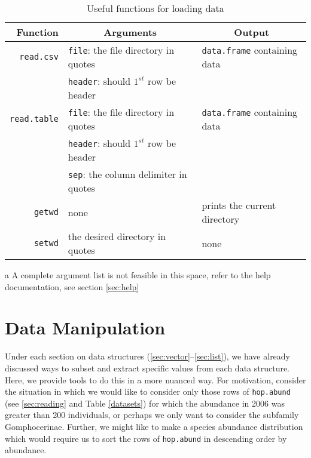 \documentclass[12pt]{article}
\begin{document}
\begin{table}[!htb]
	\begin{threeparttable}
	\caption{Useful functions for loading data}

	\begin{tabular}{r l l}
		\hline
		Function 	&	\multicolumn{1}{c}{Arguments\tnote{a}}		&	\multicolumn{1}{c}{Output}		\\
		\hline
		\verb+read.csv+	&	\verb+file+: the file directory in quotes			&	\verb+data.frame+ containing data	\\
						&	\verb+header+: should $1^{st}$ row be header		&								\\	
		\verb+read.table+	&	\verb+file+: the file directory in quotes			&	\verb+data.frame+ containing data	\\
						&	\verb+header+: should $1^{st}$ row be header		&								\\
						&	\verb+sep+: the column delimiter in quotes 		&								\\
		\verb+getwd+		&	none										&	prints the current directory		\\
		\verb+setwd+		&	the desired directory in quotes					&	none 						\\
		\hline
	\end{tabular}
	\begin{tablenotes}
		\item[a] A complete argument list is not feasible in this space, refer to the help documentation, see section \ref{sec:help}
	\end{tablenotes}
	\end{threeparttable}
\end{table}

\section{Data Manipulation}
Under each section on data structures (\ref{sec:vector}--\ref{sec:list}), we have already discussed ways to subset and extract specific values from each data structure.  Here, we provide tools to do this in a more nuanced way.  For motivation, consider the situation in which we would like to consider only those rows of \verb+hop.abund+ (see \ref{sec:reading} and Table \ref{datasets}) for which the abundance in 2006 was greater than 200 individuals, or perhaps we only want to consider the subfamily Gomphocerinae.  Further, we might like to make a species abundance distribution which would require us to sort the rows of \verb+hop.abund+ in descending order by abundance.
\end{document}
